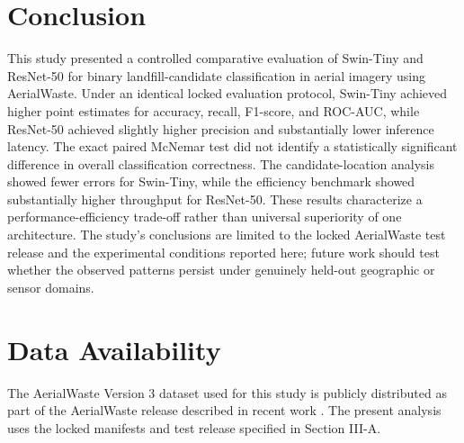 \documentclass[journal]{IEEEtran}
\begin{document}
\section{Conclusion}
This study presented a controlled comparative evaluation of Swin-Tiny and ResNet-50 for binary landfill-candidate classification in aerial imagery using AerialWaste. Under an identical locked evaluation protocol, Swin-Tiny achieved higher point estimates for accuracy, recall, F1-score, and ROC-AUC, while ResNet-50 achieved slightly higher precision and substantially lower inference latency. The exact paired McNemar test did not identify a statistically significant difference in overall classification correctness. The candidate-location analysis showed fewer errors for Swin-Tiny, while the efficiency benchmark showed substantially higher throughput for ResNet-50. These results characterize a performance-efficiency trade-off rather than universal superiority of one architecture. The study's conclusions are limited to the locked AerialWaste test release and the experimental conditions reported here; future work should test whether the observed patterns persist under genuinely held-out geographic or sensor domains.

\section*{Data Availability}
The AerialWaste Version 3 dataset used for this study is publicly distributed as part of the AerialWaste release described in recent work \cite{gibellini2025pipeline}. The present analysis uses the locked manifests and test release specified in Section III-A.
\end{document}
